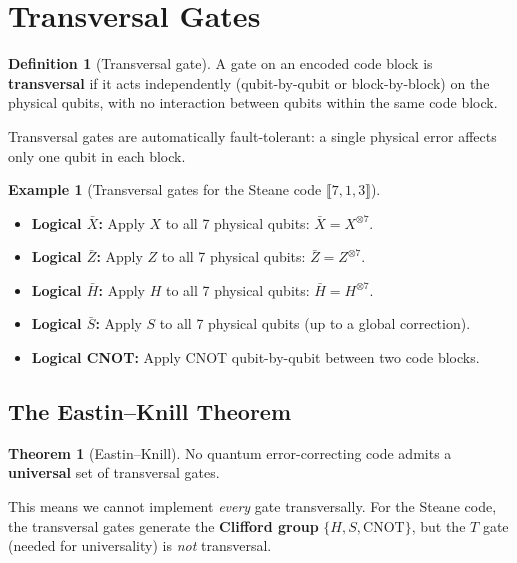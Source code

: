 \documentclass[11pt]{article}
\theoremstyle{definition}
\newtheorem{definition}{Definition}[section]
\newtheorem{example}{Example}[section]
\newtheorem{theorem}{Theorem}[section]
\begin{document}
\section{Transversal Gates}

\begin{definition}[Transversal gate]
A gate on an encoded code block is \textbf{transversal} if it acts independently (qubit-by-qubit or block-by-block) on the physical qubits, with no interaction between qubits within the same code block.
\end{definition}

Transversal gates are automatically fault-tolerant: a single physical error affects only one qubit in each block.

\begin{example}[Transversal gates for the Steane code $\llbracket 7,1,3\rrbracket$]
\begin{itemize}
    \item \textbf{Logical $\bar{X}$:} Apply $X$ to all 7 physical qubits: $\bar{X}=X^{\otimes 7}$.
    \item \textbf{Logical $\bar{Z}$:} Apply $Z$ to all 7 physical qubits: $\bar{Z}=Z^{\otimes 7}$.
    \item \textbf{Logical $\bar{H}$:} Apply $H$ to all 7 physical qubits: $\bar{H}=H^{\otimes 7}$.
    \item \textbf{Logical $\bar{S}$:} Apply $S$ to all 7 physical qubits (up to a global correction).
    \item \textbf{Logical CNOT:} Apply CNOT qubit-by-qubit between two code blocks.
\end{itemize}
\end{example}

\subsection{The Eastin--Knill Theorem}

\begin{theorem}[Eastin--Knill]
No quantum error-correcting code admits a \textbf{universal} set of transversal gates.
\end{theorem}

This means we cannot implement \emph{every} gate transversally.  For the Steane code, the transversal gates generate the \textbf{Clifford group} $\{H,S,\mathrm{CNOT}\}$, but the $T$ gate (needed for universality) is \emph{not} transversal.
\end{document}
